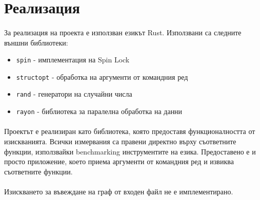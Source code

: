 \section{Реализация}

\paragraph*{} За реализация на проекта е използван езикът Rust. Използвани са следните външни библиотеки:
\begin{itemize}
\item \verb|spin| - имплементация на Spin Lock
\item \verb|structopt| - обработка на аргументи от командния ред
\item \verb|rand| - генератори на случайни числа
\item \verb|rayon| - библиотека за паралелна обработка на данни
\end{itemize}

\paragraph*{} Проектът е реализиран като библиотека, която предоставя функционалността от изискванията. Всички измервания са правени директно върху съответните функции, използвайки benchmarking инструментите на езика. Предоставено е и просто приложение, което приема аргументи от командния ред и извиква съответните функции.

\paragraph*{} Изискването за въвеждане на граф от входен файл не е имплементирано.
